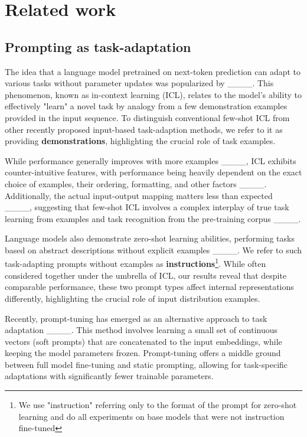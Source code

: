 \section{Related work}
\subsection{Prompting as task-adaptation}

The idea that a language model pretrained on next-token prediction can adapt to various tasks without parameter updates was popularized by ____. This phenomenon, known as in-context learning (ICL), relates to the model's ability to effectively "learn" a novel task by analogy from a few demonstration examples provided in the input sequence. To distinguish conventional few-shot ICL from other recently proposed input-based task-adaption methods, we refer to it as providing \textbf{demonstrations}, highlighting the crucial role of task examples.

While performance generally improves with more examples ____, ICL exhibits counter-intuitive features, with performance being heavily dependent on the exact choice of examples, their ordering, formatting, and other factors ____. Additionally, the actual input-output mapping matters less than expected ____, suggesting that few-shot ICL involves a complex interplay of true task learning from examples and task recognition from the pre-training corpus ____.

Language models also demonstrate zero-shot learning abilities, performing tasks based on abstract descriptions without explicit examples ____. We refer to such task-adapting prompts without examples as \textbf{instructions}\footnote{We use "instruction" referring only to the format of the prompt for zero-shot learning and do all experiments on base models that were not instruction fine-tuned}. While often considered together under the umbrella of ICL, our results reveal that despite comparable performance, these two prompt types affect internal representations differently, highlighting the crucial role of input distribution examples.

Recently, prompt-tuning has emerged as an alternative approach to task adaptation ____. This method involves learning a small set of continuous vectors (soft prompts) that are concatenated to the input embeddings, while keeping the model parameters frozen. Prompt-tuning offers a middle ground between full model fine-tuning and static prompting, allowing for task-specific adaptations with significantly fewer trainable parameters.


